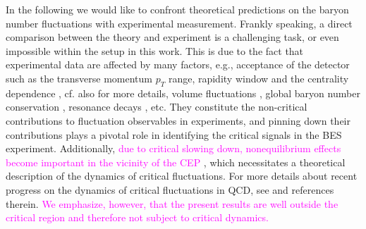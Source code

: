\documentclass[%
reprint,
superscriptaddress,
showpacs,preprintnumbers,
 amsmath,amssymb,
 aps,
prd,
]{revtex4-1}
\newcommand{\colfab}[1]{\textcolor{magenta}{#1}}
\begin{document}
In the following we would like to confront theoretical predictions on the baryon number fluctuations with experimental measurement. Frankly speaking, a direct comparison between the theory and experiment is a challenging task, or even impossible within the setup in this work. This is due to the fact that experimental data are affected by many factors, e.g.,  acceptance of the detector such as the transverse momentum $p_T$ range, rapidity window and the centrality dependence \cite{Adamczyk:2013dal,Luo:2015ewa,Adam:2020unf,Nonaka:2020crv,Pandav:2020uzx}, cf. also \cite{Luo:2017faz,Adamczyk:2017iwn} for more details, volume fluctuations \cite{Luo:2013bmi}, global baryon number conservation \cite{Braun-Munzinger:2016yjz,Vovchenko:2020tsr}, resonance decays \cite{Nahrgang:2014fza}, etc. They constitute the non-critical contributions to fluctuation observables in experiments, and pinning down their contributions plays a pivotal role in identifying the critical signals in the BES experiment. Additionally, \colfab{due to critical slowing down, nonequilibrium effects become important in the vicinity of the CEP \cite{Berdnikov:1999ph}}, which necessitates a theoretical description of the dynamics of critical fluctuations. For more details about recent progress on the dynamics of critical fluctuations in QCD, see \cite{Bluhm:2020mpc} and references therein. \colfab{We emphasize, however, that the present results are well outside the critical region and therefore not subject to critical dynamics.}
\end{document}
